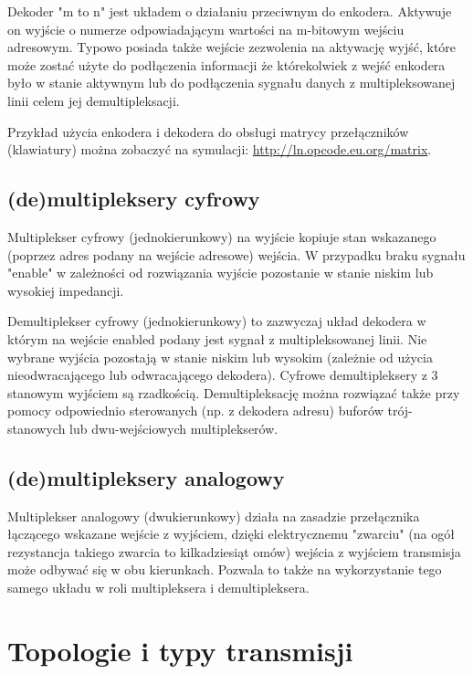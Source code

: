 Dekoder "m to n" jest układem o działaniu przeciwnym do enkodera. Aktywuje on wyjście o numerze odpowiadającym wartości na m-bitowym wejściu adresowym. Typowo posiada także wejście zezwolenia na aktywację wyjść, które może zostać użyte do podłączenia informacji że którekolwiek z wejść enkodera było w stanie aktywnym lub do podłączenia sygnału danych z multipleksowanej linii celem jej demultipleksacji.

Przykład użycia enkodera i dekodera do obsługi matrycy przełączników (klawiatury) można zobaczyć na symulacji: \url{http://ln.opcode.eu.org/matrix}.

\subsection{(de)multipleksery cyfrowy}

Multiplekser cyfrowy (jednokierunkowy) na wyjście kopiuje stan wskazanego (poprzez adres podany na wejście adresowe) wejścia. W przypadku braku sygnału "enable" w zależności od rozwiązania wyjście pozostanie w stanie niskim lub wysokiej impedancji.

Demultiplekser cyfrowy (jednokierunkowy) to zazwyczaj układ dekodera w którym na wejście enabled podany jest sygnał z multipleksowanej linii. Nie wybrane wyjścia pozostają w stanie niskim lub wysokim (zależnie od użycia nieodwracającego lub odwracającego dekodera). Cyfrowe demultipleksery z 3 stanowym wyjściem są rzadkością. Demultipleksację można rozwiązać także przy pomocy odpowiednio sterowanych (np. z dekodera adresu) buforów trój-stanowych lub dwu-wejściowych multiplekserów.

\subsection{(de)multipleksery analogowy}

Multiplekser analogowy (dwukierunkowy) działa na zasadzie przełącznika łączącego wskazane wejście z wyjściem, dzięki elektrycznemu "zwarciu" (na ogół rezystancja takiego zwarcia to kilkadziesiąt omów) wejścia z wyjściem transmisja może odbywać się w obu kierunkach. Pozwala to także na wykorzystanie tego samego układu w roli multipleksera i demultipleksera.


\section{Topologie i typy transmisji}

